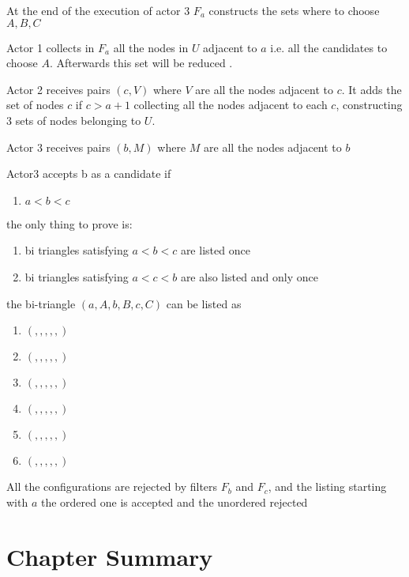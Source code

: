  At the end of the execution of actor 3 $F_a$ constructs the sets where to choose $A,B,C$
 
 Actor 1 collects in $F_a$ all the nodes in $U$ adjacent to $a$ i.e. all the candidates to choose $A$. Afterwards this set will be reduced . 
 
 Actor 2 receives pairs $(c,V)$ where $V$ are all the nodes adjacent to $c$. It adds the set of nodes $c$ if $c>a+1$ collecting all the nodes adjacent to each $c$, constructing 3 sets of nodes belonging to $U$.
 
 Actor 3 receives pairs $(b,M) $ where $M$ are all the nodes adjacent to $b$
 
 Actor3 accepts b as a candidate if
 
 \begin{enumerate}
     \item $a < b < c$
 \end{enumerate}
 
 the only thing to prove is:
 
 \begin{enumerate}
     \item bi triangles satisfying $a < b < c$ are listed once
     \item bi triangles satisfying $a < c < b$ are also listed and only  once
 \end{enumerate}
 
 the bi-triangle  $(a,A,b,B,c,C)$ can be listed as 
 
 \begin{enumerate}
     \item $(,,,,,)$
      \item $(,,,,,)$
       \item $(,,,,,)$
        \item $(,,,,,)$
         \item $(,,,,,)$
          \item $(,,,,,)$
 \end{enumerate}
 
 All the configurations are rejected by filters $F_b$ and $F_c$, and the listing starting with $a$ the ordered one is accepted and the unordered rejected  \fi
 
 \section{Chapter Summary}